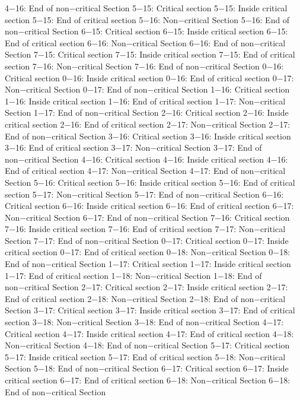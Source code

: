 4−16: End of non−critical Section
5−15: Critical section
5−15: Inside critical section
5−15: End of critical section
5−16: Non−critical Section
5−16: End of non−critical Section
6−15: Critical section
6−15: Inside critical section
6−15: End of critical section
6−16: Non−critical Section
6−16: End of non−critical Section
7−15: Critical section
7−15: Inside critical section
7−15: End of critical section
7−16: Non−critical Section
7−16: End of non−critical Section
0−16: Critical section
0−16: Inside critical section
0−16: End of critical section
0−17: Non−critical Section
0−17: End of non−critical Section
1−16: Critical section
1−16: Inside critical section
1−16: End of critical section
1−17: Non−critical Section
1−17: End of non−critical Section
2−16: Critical section
2−16: Inside critical section
2−16: End of critical section
2−17: Non−critical Section
2−17: End of non−critical Section
3−16: Critical section
3−16: Inside critical section
3−16: End of critical section
3−17: Non−critical Section
3−17: End of non−critical Section
4−16: Critical section
4−16: Inside critical section
4−16: End of critical section
4−17: Non−critical Section
4−17: End of non−critical Section
5−16: Critical section
5−16: Inside critical section
5−16: End of critical section
5−17: Non−critical Section
5−17: End of non−critical Section
6−16: Critical section
6−16: Inside critical section
6−16: End of critical section
6−17: Non−critical Section
6−17: End of non−critical Section
7−16: Critical section
7−16: Inside critical section
7−16: End of critical section
7−17: Non−critical Section
7−17: End of non−critical Section
0−17: Critical section
0−17: Inside critical section
0−17: End of critical section
0−18: Non−critical Section
0−18: End of non−critical Section
1−17: Critical section
1−17: Inside critical section
1−17: End of critical section
1−18: Non−critical Section
1−18: End of non−critical Section
2−17: Critical section
2−17: Inside critical section
2−17: End of critical section
2−18: Non−critical Section
2−18: End of non−critical Section
3−17: Critical section
3−17: Inside critical section
3−17: End of critical section
3−18: Non−critical Section
3−18: End of non−critical Section
4−17: Critical section
4−17: Inside critical section
4−17: End of critical section
4−18: Non−critical Section
4−18: End of non−critical Section
5−17: Critical section
5−17: Inside critical section
5−17: End of critical section
5−18: Non−critical Section
5−18: End of non−critical Section
6−17: Critical section
6−17: Inside critical section
6−17: End of critical section
6−18: Non−critical Section
6−18: End of non−critical Section
